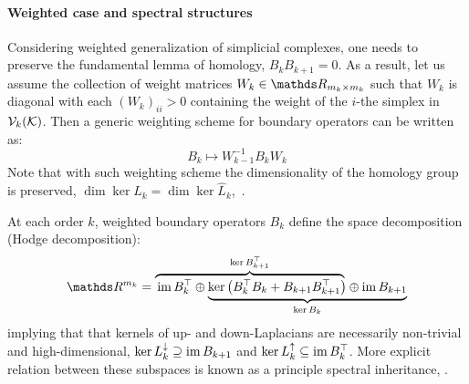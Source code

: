 \paragraph{ Weighted case and spectral structures }

Considering weighted generalization of simplicial complexes, one needs to preserve the fundamental lemma of homology, \( B_k B_{k+1} = 0 \). As a result, let us assume the collection of weight matrices \( W_k \in \ds R_{m_k \times m_k} \) such that  \( W_k \) is diagonal with each \( (W_k)_{ii} > 0 \) containing the weight of the \(i\)-the simplex in \( \mathcal{V}_{k}(\mathcal{K}) \). Then a generic weighting scheme for boundary operators can be written as:
\begin{equation}
      B_k \mapsto W_{k-1}^{-1} B_k W_k
\end{equation}
Note that with such weighting scheme the dimensionality of the homology group is preserved, \( \dim \ker L_k = \dim \ker \widehat L_k \),~\cite{guglielmi2023quantifying}.

At each order \( k \), weighted boundary operators \( B_k \) define the space decomposition (Hodge decomposition):
\begin{equation}
      \ds R^{m_k} = \lefteqn{\overbrace{\phantom{\im B_k^\top \oplus  \ker \left( B_k^\top B_k + B_{k+1} B_{k+1}^\top \right)}}^{\ker B_{k+1}^\top}} \im B_k^\top \oplus
      \underbrace{\ker \left( B_k^\top B_k + B_{k+1} B_{k+1}^\top \right) \oplus  \im B_{k+1}}_{\ker B_k}            
\end{equation}
implying that that kernels of up- and down-Laplacians are necessarily non-trivial and high-dimensional, \( \ker L_{k}^{\downarrow} \supseteq \operatorname{im} B_{k+1} \) and \( \ker L_{k}^{\uparrow} \subseteq \operatorname{im} B_k^\top \). More explicit relation between these subspaces is known as a principle spectral inheritance, \cite{guglielmi2023quantifying}.


